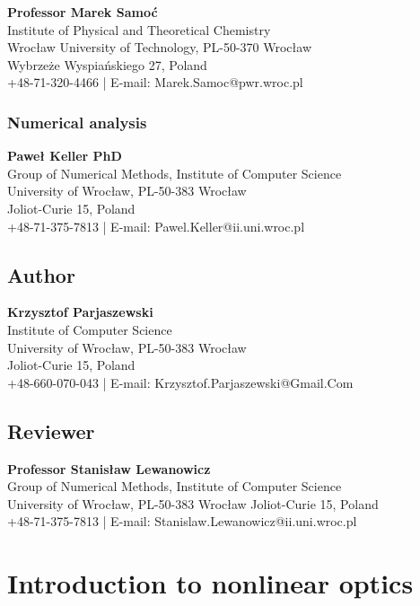 \documentclass[12pt,twoside,a4paper]{article}
\numberwithin{equation}{subsection}
\numberwithin{figure}{subsection}
\begin{document}
\textbf{Professor Marek Samoć} \\
Institute of Physical and Theoretical Chemistry \\
Wrocław University of Technology, PL-50-370 Wrocław \\
Wybrzeże Wyspiańskiego 27, Poland \\
+48-71-320-4466 | E-mail: Marek.Samoc@pwr.wroc.pl

\subsubsection*{Numerical analysis}

\textbf{Paweł Keller PhD} \\
Group of Numerical Methods, Institute of Computer Science \\
University of Wrocław, PL-50-383 Wrocław \\
Joliot-Curie 15, Poland \\
+48-71-375-7813 | E-mail: Pawel.Keller@ii.uni.wroc.pl

\subsection*{Author}  \label{chap:abstract_author}

\textbf{Krzysztof Parjaszewski} \\
Institute of Computer Science \\
University of Wrocław, PL-50-383 Wrocław \\
Joliot-Curie 15, Poland \\
+48-660-070-043 | E-mail: Krzysztof.Parjaszewski@Gmail.Com

\subsection*{Reviewer}  \label{chap:abstract_reviewer}

\textbf{Professor Stanisław Lewanowicz} \\
Group of Numerical Methods, Institute of Computer Science \\
University of Wrocław, PL-50-383 Wrocław
Joliot-Curie 15, Poland \\
+48-71-375-7813 | E-mail: Stanislaw.Lewanowicz@ii.uni.wroc.pl

\section{Introduction to nonlinear optics}  \label{chap:introducion}
\end{document}
